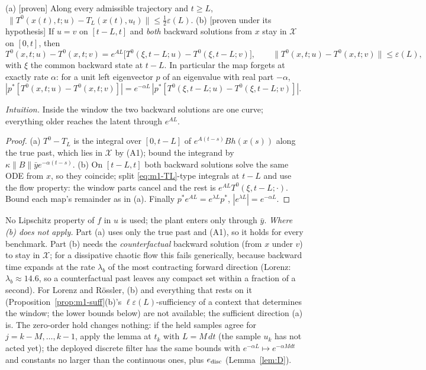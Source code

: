 \begin{lemma}\label{lem:m2-tail}
(a) [proven] Along every admissible trajectory and $t\ge L$,
$\ \|T^0(x(t),t;u)-T_L(x(t),u_t)\|\le\tfrac12\varepsilon(L)$.
(b) [proven under its hypothesis] If $u=v$ on $[t-L,t]$ and \emph{both} backward solutions from $x$ stay in
$\mathcal X$ on $[0,t]$, then
\[
 T^0(x,t;u)-T^0(x,t;v)=e^{AL}\big[T^0(\xi,t-L;u)-T^0(\xi,t-L;v)\big],\qquad
 \|T^0(x,t;u)-T^0(x,t;v)\|\le\varepsilon(L),
\]
with $\xi$ the common backward state at $t-L$. In particular the map forgets at exactly rate $\alpha$:
for a unit left eigenvector $p$ of an eigenvalue with real part $-\alpha$,
$|p^*[T^0(x,t;u)-T^0(x,t;v)]|=e^{-\alpha L}\,|p^*[T^0(\xi,t-L;u)-T^0(\xi,t-L;v)]|$.
\end{lemma}
\emph{Intuition.} Inside the window the two backward solutions are one curve; everything older reaches
the latent through $e^{AL}$.
\begin{proof}
(a) $T^0-T_L$ is the integral over $[0,t-L]$ of $e^{A(t-s)}Bh(x(s))$ along the true past, which lies in
$\mathcal X$ by (A1); bound the integrand by $\kappa\|B\|\bar y e^{-\alpha(t-s)}$. (b) On $[t-L,t]$ both
backward solutions solve the same ODE from $x$, so they coincide; split \eqref{eq:m1-TL}-type integrals at
$t-L$ and use the flow property: the window parts cancel and the rest is $e^{AL}T^0(\xi,t-L;\cdot)$. Bound
each map's remainder as in (a). Finally $p^*e^{AL}=e^{\lambda L}p^*$, $|e^{\lambda L}|=e^{-\alpha L}$.
\end{proof}
No Lipschitz property of $f$ in $u$ is used; the plant enters only through $\bar y$. \emph{Where (b) does not
apply.} Part (a) uses only the true past and (A1), so it holds for every benchmark. Part (b) needs the
\emph{counterfactual} backward solution (from $x$ under $v$) to stay in $\mathcal X$; for a dissipative chaotic flow
this fails generically, because backward time expands at the rate $\lambda_b$ of the most contracting forward
direction (Lorenz: $\lambda_b\approx14.6$, so a counterfactual past leaves any compact set within a fraction of a
second). For Lorenz and R\"ossler, (b) and everything that rests on it (Proposition~\ref{prop:m1-suff}(b)'s
$\ell\varepsilon(L)$-sufficiency of a context that determines the window; the lower bounds below) are not
available; the sufficient direction (a) is. The zero-order hold changes nothing: if the held samples agree for
$j=k-M,\dots,k-1$, apply the lemma at $t_k$ with $L=M\,dt$ (the sample $u_k$ has not acted yet); the deployed
discrete filter has the same bounds with $e^{-\alpha L}\mapsto e^{-\alpha M dt}$ and constants no larger than the
continuous ones, plus $e_{\rm disc}$ (Lemma~\ref{lem:D}).

